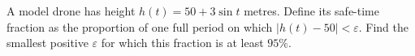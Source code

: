 A model drone has height $h(t)=50+3\sin t$ metres. Define its safe-time fraction as the proportion of one full period on which $|h(t)-50|<\varepsilon$. Find the smallest positive $\varepsilon$ for which this fraction is at least $95\%$.
